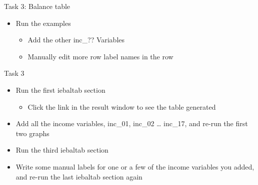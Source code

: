 \documentclass[aspectratio=169]{beamer}
\begin{document}
\begin{frame}{Task 3: Balance table}
\begin{itemize}
	\item Run the examples
		\begin{itemize}
			\item Add the other inc\_?? Variables
			\item Manually edit more row label names in the row
		\end{itemize}
	\end{itemize}
\end{frame}


\begin{frame}{Task 3}
\begin{itemize}
	\item Run the first iebaltab section
	\begin{itemize}
		\item Click the link in the result window to see the table generated
	\end{itemize}
	\item Add all the income variables, inc\_01, inc\_02 … inc\_17, and re-run the first two graphs
	\item Run the third iebaltab section
	\item Write some manual labels for one or a few of the income variables you added, and re-run the last iebaltab section again
\end{itemize}
\end{frame}
\end{document}
